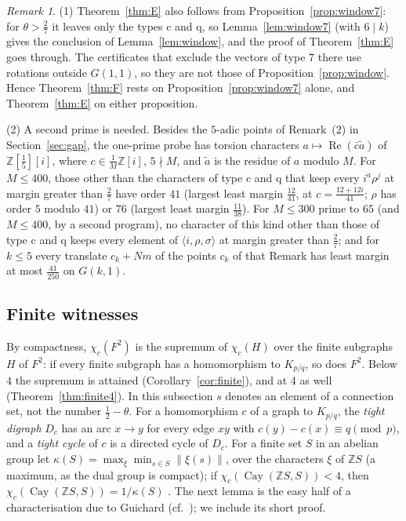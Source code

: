 \documentclass[11pt,a4paper]{amsart}
\theoremstyle{remark}
\newtheorem*{remark}{Remark}
\newcommand{\Z}{\mathbb{Z}}
\newcommand{\Cay}{\operatorname{Cay}}
\begin{document}
\begin{remark}
(1) Theorem~\ref{thm:E} also follows from Proposition~\ref{prop:window7}: for $\theta>\frac27$ it leaves only the types
c and q, so Lemma~\ref{lem:window7} (with $6\mid k$) gives the conclusion of Lemma~\ref{lem:window}, and the proof of
Theorem~\ref{thm:E} goes through. The certificates that exclude the vectors of type $7$ there use rotations outside
$G(1,1)$, so they are not those of Proposition~\ref{prop:window}. Hence Theorem~\ref{thm:F} rests on
Proposition~\ref{prop:window7} alone, and Theorem~\ref{thm:E} on either proposition.

(2) A second prime is needed. Besides the $5$-adic points of Remark~(2) in Section~\ref{sec:gap}, the one-prime probe
has torsion characters $a\mapsto\operatorname{Re}(\bar c\tilde a)$ of $\Z[\frac15][i]$, where $c\in\frac1M\Z[i]$, $5\nmid M$,
and $\tilde a$ is the residue of $a$ modulo $M$. For $M\le400$, those other than the characters of type c and q that
keep every $i^a\rho^j$ at margin greater than $\frac27$ have order $41$ (largest least margin $\frac{12}{41}$, at
$c=\frac{12+12i}{41}$; $\rho$ has order $5$ modulo $41$) or $76$ (largest least margin $\frac{11}{38}$). For
$M\le300$ prime to $65$ (and $M\le400$, by a second program), no character of this kind other than those of type c and
q keeps every element of $\langle i,\rho,\sigma\rangle$ at margin greater than $\frac27$; and for $k\le5$ every
translate $c_k+Nm$ of the points $c_k$ of that Remark has least margin at most $\frac{41}{250}$ on $G(k,1)$.
\end{remark}

\subsection*{Finite witnesses}
By compactness, $\chi_c(F^2)$ is the supremum of $\chi_c(H)$ over the finite subgraphs $H$ of $F^2$: if every finite
subgraph has a homomorphism to $K_{p/q}$, so does $F^2$. Below $4$ the supremum is attained
(Corollary~\ref{cor:finite}), and at $4$ as well (Theorem~\ref{thm:finite4}). In this subsection $s$ denotes an element of a connection set, not the number
$\frac12-\theta$. For a homomorphism $c$
of a graph to $K_{p/q}$, the \emph{tight digraph} $D_c$ has an arc $x\to y$ for every edge $xy$ with
$c(y)-c(x)\equiv q\pmod p$, and a \emph{tight cycle} of $c$ is a directed cycle of $D_c$. For a finite set $S$ in an
abelian group let $\kappa(S)=\max_\xi\min_{s\in S}\|\xi(s)\|$, over the characters $\xi$ of $\Z S$ (a maximum, as the
dual group is compact); if $\chi_c(\Cay(\Z S,S))<4$, then $\chi_c(\Cay(\Z S,S))=1/\kappa(S)$
\cite[Corollary~2]{Winding}. The next lemma is the easy half of a characterisation due to Guichard \cite{Guichard}
(cf.\ \cite{Zhu}); we include its short proof.
\end{document}

